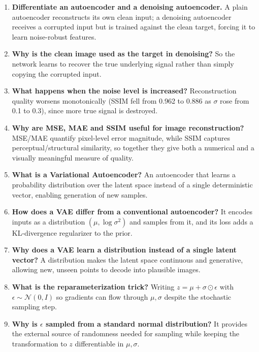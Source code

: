 \documentclass[10pt]{article}
\begin{document}
\begin{enumerate}[label=\arabic*.]
\item \textbf{Differentiate an autoencoder and a denoising autoencoder.} A plain autoencoder reconstructs
its own clean input; a denoising autoencoder receives a corrupted input but is trained against the clean
target, forcing it to learn noise-robust features.

\item \textbf{Why is the clean image used as the target in denoising?} So the network learns to recover
the true underlying signal rather than simply copying the corrupted input.

\item \textbf{What happens when the noise level is increased?} Reconstruction quality worsens
monotonically (SSIM fell from 0.962 to 0.886 as $\sigma$ rose from 0.1 to 0.3), since more true signal is
destroyed.

\item \textbf{Why are MSE, MAE and SSIM useful for image reconstruction?} MSE/MAE quantify pixel-level
error magnitude, while SSIM captures perceptual/structural similarity, so together they give both a
numerical and a visually meaningful measure of quality.

\item \textbf{What is a Variational Autoencoder?} An autoencoder that learns a probability distribution
over the latent space instead of a single deterministic vector, enabling generation of new samples.

\item \textbf{How does a VAE differ from a conventional autoencoder?} It encodes inputs as a distribution
$(\mu,\log\sigma^2)$ and samples from it, and its loss adds a KL-divergence regularizer to the prior.

\item \textbf{Why does a VAE learn a distribution instead of a single latent vector?} A distribution
makes the latent space continuous and generative, allowing new, unseen points to decode into plausible
images.

\item \textbf{What is the reparameterization trick?} Writing $z=\mu+\sigma\odot\epsilon$ with
$\epsilon\sim\mathcal{N}(0,I)$ so gradients can flow through $\mu,\sigma$ despite the stochastic sampling
step.

\item \textbf{Why is $\epsilon$ sampled from a standard normal distribution?} It provides the external
source of randomness needed for sampling while keeping the transformation to $z$ differentiable in
$\mu,\sigma$.


\end{enumerate}
\end{document}
